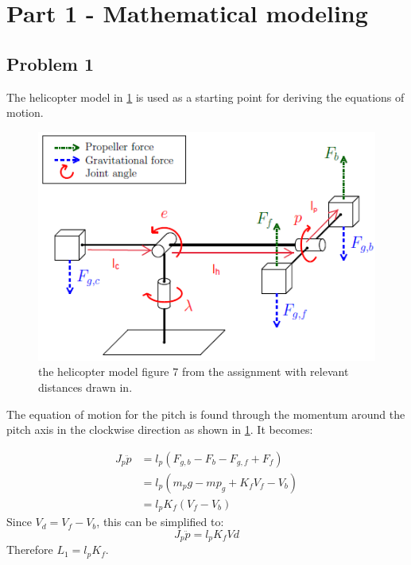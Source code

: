 
\section{Part 1 - Mathematical modeling}
\subsection{Problem 1}

The helicopter model in \cref{fig:helicopter_model} is used as a
starting point for deriving the equations of motion.

\begin{figure}[hbp]
  \caption{the helicopter model figure 7 from the assignment
    \cite[p.12]{assignment} with relevant distances drawn in.}

  \label{fig:helicopter_model}
  \includegraphics[width=\textwidth]{images/helicopter_model}
\end{figure}

The equation of motion for the pitch is found through the momentum
around the pitch axis in the clockwise direction as shown in
\cref{fig:helicopter_model}. It becomes:

\begin{align*}
  J_p\ddot{p} &= l_p(F_{g,b} - F_b - F_{g,f} + F_f) \\
              &= l_p(m_pg - mp_g + K_fV_f - V_b) \\
              &= l_pK_f(V_f-V_b)
\end{align*}
Since $V_d = V_f-V_b$, this can be simplified to:
\begin{equation}
\label{eq:pitch EoM}
  J_p\ddot{p} = l_pK_fVd
\end{equation}
Therefore $L_1 = l_pK_f$.

